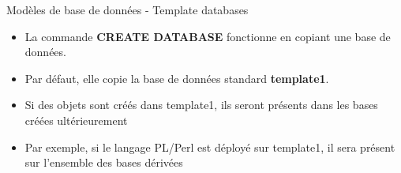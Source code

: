 
\begin{frame}[fragile]{Modèles de base de données - Template databases}

\begin{itemize}
   \item La commande \textbf{CREATE DATABASE} fonctionne en copiant une base de données.
   \item Par défaut, elle copie la base de données standard \textbf{template1}.
   \item Si des objets sont créés dans template1, ils seront présents dans les bases créées ultérieurement
   \item Par exemple, si le langage PL/Perl est déployé sur template1, il sera présent sur l'ensemble des bases dérivées
\end{itemize}

\begin{toile}
\end{toile}

\end{frame}


\newlength{\largeurtableau}
\setlength{\largeurtableau}{\textwidth}
\addtolength{\largeurtableau}{-2\leftmarginii}

